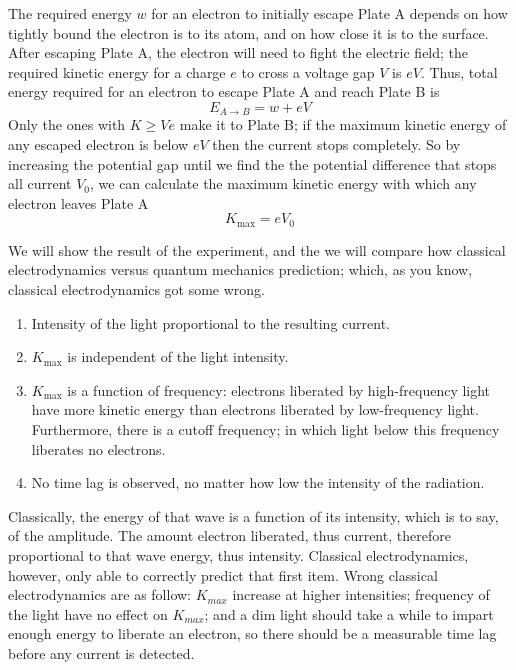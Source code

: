 \documentclass[../../main.tex]{subfiles}
\begin{document}
The required energy $w$ for an electron to initially escape Plate A depends on how tightly bound the electron is to its atom, and on how close it is to the surface. After escaping Plate A, the electron will need to fight the electric field; the required kinetic energy for a charge $e$ to cross a voltage gap $V$ is $eV$. Thus, total energy required for an electron to escape Plate A and reach Plate B is 
\begin{equation*}
    E_{A\rightarrow B}=w+eV
\end{equation*}
Only the ones with $K \geq Ve$ make it to Plate B; if the maximum kinetic energy of any escaped electron
is below $eV$ then the current stops completely. So by increasing the potential gap until we find the the potential difference that stops all current $V_0$, we can calculate the maximum kinetic energy with which any electron leaves Plate A
\begin{equation*}
    K_{\text{max}}=eV_0
\end{equation*}

We will show the result of the experiment, and the we will compare how classical electrodynamics versus quantum mechanics prediction; which, as you know, classical electrodynamics got some wrong.
\begin{enumerate}
    \item Intensity of the light proportional to the resulting current.
    \item $K_{\text{max}}$ is independent of the light intensity.
    \item $K_{\text{max}}$ is a function of frequency: electrons liberated by high-frequency light have more kinetic energy than electrons liberated by low-frequency light. Furthermore, there is a cutoff frequency; in which light below this frequency liberates no electrons.
    \item No time lag is observed, no matter how low the intensity of the radiation. 
\end{enumerate}

Classically, the energy of that wave is a function of its intensity, which is to say, of the amplitude. The amount electron liberated, thus current, therefore proportional to that wave energy, thus intensity. Classical electrodynamics, however, only able to correctly predict that first item. Wrong classical electrodynamics are as follow: $K_{max}$ increase at higher intensities; frequency of the light have no effect on $K_{max}$; and a dim light should take a while to impart enough energy to liberate an electron, so there should be a measurable time lag before any current is detected.
\end{document}
